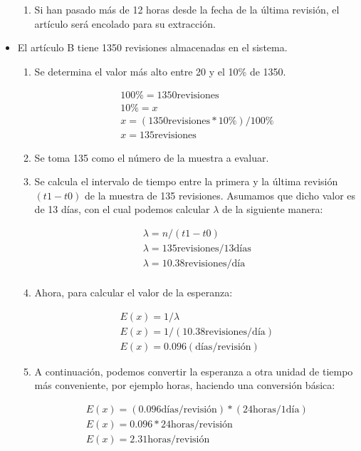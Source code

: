 \begin{itemize}
\begin{enumerate}
  \item Si han pasado más de 12 horas desde la fecha de la última revisión, el artículo será encolado para su extracción.

  \end{enumerate}

\item El artículo B tiene 1350 revisiones almacenadas en el sistema.

  \begin{enumerate}

  \item Se determina el valor más alto entre 20 y el 10\% de 1350.

  \begin{gather*}
  100\% = 1350 \text{revisiones}\\
  10\% = x\\
  x = (1350 \text{revisiones} *10\%) / 100\% \\
  x = 135 \text{revisiones}
  \end{gather*}

  \item Se toma 135 como el número de la muestra a evaluar.

  \item Se calcula el intervalo de tiempo entre la primera y la última revisión $(t1 - t0)$ de la muestra de 135 revisiones.
  Asumamos que dicho valor es de 13 días, con el cual podemos calcular $\lambda$ de la siguiente manera:

  \begin{gather*}
  \lambda = n / (t1 - t0)\\
  \lambda = 135 \text{revisiones} / 13 \text{días} \\
  \lambda = 10.38 \text{revisiones} / \text{día}\\
  \end{gather*}

  \item Ahora, para calcular el valor de la esperanza:

  \begin{gather*}
  E(x)= 1 / \lambda\\
  E(x)= 1/ ( 10.38 \text{revisiones} / \text{día})\\
  E(x)= 0.096 (\text{días} / \text{revisión})
  \end{gather*}

  \item A continuación, podemos convertir la esperanza a otra unidad de tiempo más conveniente, por ejemplo horas, haciendo una conversión básica:

  \begin{gather*}
  E(x) = (0.096 \text{días} / \text{revisión}) * (24\text{horas}/1 \text{día})\\
  E(x) = 0.096*24 \text{horas} / \text{revisión}\\
  E(x) = 2.31 \text{horas}/ \text{revisión}
  \end{gather*}

  \end{enumerate}
\end{itemize}

